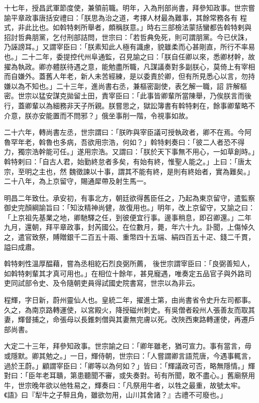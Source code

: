 \begin{pinyinscope}
 十七年，授昌武軍節度使，兼領前職。明年，入為刑部尚書，拜參知政事。世宗嘗諭平章政事唐括安禮曰：「朕思為治之道，考擇人材最為難事，其餘常務各有
 程式，非此比也。如斡特剌所舉者，頗稱朕意。」時右三部檢法蒙括蠻都告斡特剌與招討哲典朋黨，乞付刑部詰問，世宗曰：「若哲典免死，則可謂朋黨。今已伏誅，乃誣謗耳。」又謂宰臣曰：「朕素知此人極有識慮，貌雖柔而心甚剛直，所行不率易也。」二十二年，委提控代州阜通監，召見諭之曰：「朕自任卿以來，悉卿材幹，故擢為執政。卿亦體朕待遇之意，能勉盡所職，凡謀議奏對多副朕心，莫倚上有宰相而自嫌外。蓋舊人年老，新人未苦經練，是以委責於卿，但有所見悉心以言，勿持嫌以為不知也。」二十三年，進尚書右丞，兼樞密副使，表乞解一職，詔
 許解樞密。世宗以猛安謀克拋留土田，責宰臣曰：「此事皆卿輩所當陳舉，乃俟朕言而後行，蓋卿輩以為細務非天子所親。朕嘗思之，獄訟簿書有斡特剌在，餘事卿輩略不介意，朕亦安能置而不問邪？」俄坐事削一階，令視事如故。



 二十六年，轉尚書左丞，世宗謂曰：「朕昨與宰臣議可授執政者，卿不在焉。今阿魯罕年老，斡魯也多病，吾欲用宗浩，何如？」斡特剌奏曰：「彼二人者恐不得力，獨宗浩幹能可任。」遂用宗浩。又謂曰：「朕於天下事無不用心，一如草創時。」斡特剌曰：「自古人君，始勤終怠者多矣，有始有終，惟聖人能之。」上曰：「唐太宗，至明之主也，然
 魏徵諫以十事，謂其不能有終，是則有終始者，實為難矣。」二十八年，為上京留守，賜通犀帶及射生馬一。



 明昌二年致仕。承安初，有事北方，朝廷欲得舊臣任之，乃起為東京留守，遣監察御史完顏綱諭旨曰：「知汝精神尚健，故復用也。」明年，改上京留守，又諭之曰：「上京祖先基業之地，卿馳驛之任，到彼便宜行事。邊事稍息，即召卿還。」二年九月，還朝，拜平章政事，封芮國公。在位數月，薨，年六十九。訃聞，上傷悼久之，遣官致祭，賻贈銀千二百五十兩、重幣四十五端、絹四百五十疋、錢二千貫，謚曰成肅。



 斡特剌性溫厚醖藉，嘗為丞相紇石烈良弼所薦，
 後世宗謂宰臣曰：「良弼善知人，如斡特剌輩其才真可用也。」在相位十餘年，甚見寵遇，唯奏定五品官子與外路司吏同試部令史、及令隨朝吏員得試國史院書寫，世宗以為非云。



 程輝，字日新，蔚州靈仙人也。皇統二年，擢進士第，由尚書省令史升左司都事。久之，為南京路轉運使，以宮殿火，降授磁州刺史。有吳僧者殺州人張善友而取其妻，輝督捕之，命張母以長錐刺僧與其妻無完膚以死。改陜西東路轉運使，再遷戶部尚書。



 大定二十三年，拜參知政事。世宗諭之曰：「卿年雖老，猶可宣力。事有當言，毋
 或隱默。卿其勉之。」一日，輝侍朝，世宗曰：「人嘗謂卿言語荒唐，今遇事輒言，過於王蔚。」顧謂宰臣曰：「卿等以為何如？」皆曰：「輝議政可否，略無隱情。」輝對曰：「臣年老耳聵，第患聽聞不審，或失奏對。茍有所聞，敢不盡心。」舊廟祭用牛，世宗晚年欲以他牲易之，輝奏曰：「凡祭用牛者，以牲之最重，故號太牢。《語》曰『犁牛之子騂且角，雖欲勿用，山川其舍諸？』古禮不可廢也。」




\end{pinyinscope}
